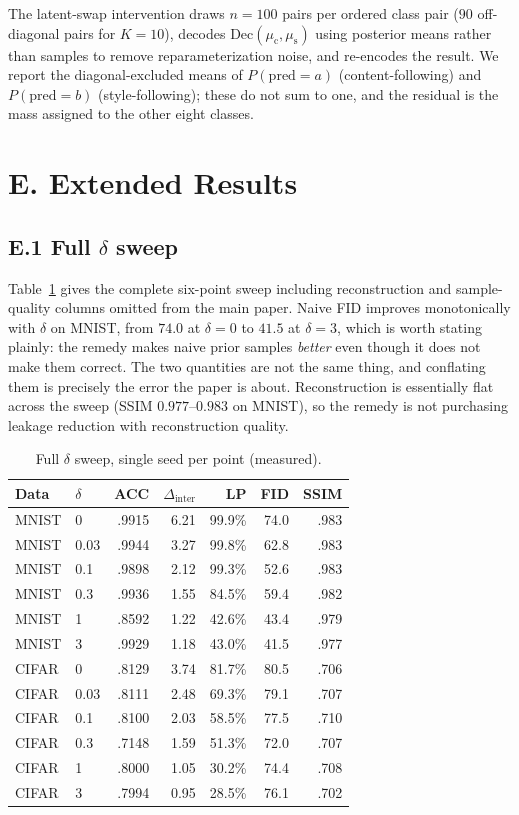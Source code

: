 \documentclass[letterpaper]{article} %
\newcommand{\muc}{\mu_{\mathrm{c}}}
\newcommand{\mus}{\mu_{\mathrm{s}}}
\newcommand{\Dinter}{\Delta_{\mathrm{inter}}}
\begin{document}
The latent-swap intervention draws $n{=}100$ pairs per ordered class pair
($90$ off-diagonal pairs for $K{=}10$), decodes $\mathrm{Dec}(\muc,\mus)$
using posterior means rather than samples to remove reparameterization noise,
and re-encodes the result. We report the diagonal-excluded means of
$P(\mathrm{pred}{=}a)$ (content-following) and $P(\mathrm{pred}{=}b)$
(style-following); these do not sum to one, and the residual is the mass
assigned to the other eight classes.

\section{E. Extended Results}

\subsection{E.1 Full $\delta$ sweep}

Table~\ref{tab:fullsweep} gives the complete six-point sweep including
reconstruction and sample-quality columns omitted from the main paper.
Naive FID improves monotonically with $\delta$ on MNIST, from $74.0$ at
$\delta{=}0$ to $41.5$ at $\delta{=}3$, which is worth stating plainly: the
remedy makes naive prior samples \emph{better} even though it does not make
them correct. The two quantities are not the same thing, and conflating them
is precisely the error the paper is about. Reconstruction is essentially
flat across the sweep (SSIM $0.977$--$0.983$ on MNIST), so the remedy is not
purchasing leakage reduction with reconstruction quality.

\begin{table}[h]
\centering
\scriptsize
\setlength{\tabcolsep}{3pt}
\caption{Full $\delta$ sweep, single seed per point (measured).}
\label{tab:fullsweep}
\begin{tabular}{llrrrrr}
\toprule
Data & $\delta$ & ACC & $\Dinter$ & LP & FID & SSIM \\
\midrule
MNIST & 0    & .9915 & 6.21 & 99.9\% & 74.0 & .983 \\
MNIST & 0.03 & .9944 & 3.27 & 99.8\% & 62.8 & .983 \\
MNIST & 0.1  & .9898 & 2.12 & 99.3\% & 52.6 & .983 \\
MNIST & 0.3  & .9936 & 1.55 & 84.5\% & 59.4 & .982 \\
MNIST & 1    & .8592 & 1.22 & 42.6\% & 43.4 & .979 \\
MNIST & 3    & .9929 & 1.18 & 43.0\% & 41.5 & .977 \\
\midrule
CIFAR & 0    & .8129 & 3.74 & 81.7\% & 80.5 & .706 \\
CIFAR & 0.03 & .8111 & 2.48 & 69.3\% & 79.1 & .707 \\
CIFAR & 0.1  & .8100 & 2.03 & 58.5\% & 77.5 & .710 \\
CIFAR & 0.3  & .7148 & 1.59 & 51.3\% & 72.0 & .707 \\
CIFAR & 1    & .8000 & 1.05 & 30.2\% & 74.4 & .708 \\
CIFAR & 3    & .7994 & 0.95 & 28.5\% & 76.1 & .702 \\
\bottomrule
\end{tabular}
\end{table}
\end{document}
